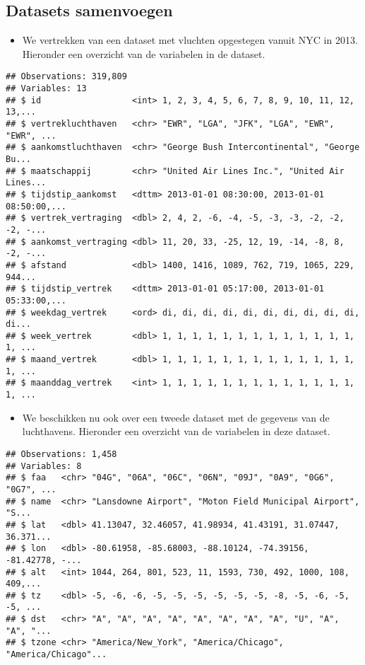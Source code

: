 \documentclass[]{memoir}
\providecommand{\tightlist}{%
  \setlength{\itemsep}{0pt}\setlength{\parskip}{0pt}}
\begin{document}
\subsection{Datasets samenvoegen}\label{datasets-samenvoegen}

\begin{itemize}
\tightlist
\item
  We vertrekken van een dataset met vluchten opgestegen vanuit NYC in
  2013. Hieronder een overzicht van de variabelen in de dataset.
\end{itemize}

\begin{verbatim}
## Observations: 319,809
## Variables: 13
## $ id                  <int> 1, 2, 3, 4, 5, 6, 7, 8, 9, 10, 11, 12, 13,...
## $ vertrekluchthaven   <chr> "EWR", "LGA", "JFK", "LGA", "EWR", "EWR", ...
## $ aankomstluchthaven  <chr> "George Bush Intercontinental", "George Bu...
## $ maatschappij        <chr> "United Air Lines Inc.", "United Air Lines...
## $ tijdstip_aankomst   <dttm> 2013-01-01 08:30:00, 2013-01-01 08:50:00,...
## $ vertrek_vertraging  <dbl> 2, 4, 2, -6, -4, -5, -3, -3, -2, -2, -2, -...
## $ aankomst_vertraging <dbl> 11, 20, 33, -25, 12, 19, -14, -8, 8, -2, -...
## $ afstand             <dbl> 1400, 1416, 1089, 762, 719, 1065, 229, 944...
## $ tijdstip_vertrek    <dttm> 2013-01-01 05:17:00, 2013-01-01 05:33:00,...
## $ weekdag_vertrek     <ord> di, di, di, di, di, di, di, di, di, di, di...
## $ week_vertrek        <dbl> 1, 1, 1, 1, 1, 1, 1, 1, 1, 1, 1, 1, 1, 1, ...
## $ maand_vertrek       <dbl> 1, 1, 1, 1, 1, 1, 1, 1, 1, 1, 1, 1, 1, 1, ...
## $ maanddag_vertrek    <int> 1, 1, 1, 1, 1, 1, 1, 1, 1, 1, 1, 1, 1, 1, ...
\end{verbatim}

\begin{itemize}
\tightlist
\item
  We beschikken nu ook over een tweede dataset met de gegevens van de
  luchthavens. Hieronder een overzicht van de variabelen in deze
  dataset.
\end{itemize}

\begin{verbatim}
## Observations: 1,458
## Variables: 8
## $ faa   <chr> "04G", "06A", "06C", "06N", "09J", "0A9", "0G6", "0G7", ...
## $ name  <chr> "Lansdowne Airport", "Moton Field Municipal Airport", "S...
## $ lat   <dbl> 41.13047, 32.46057, 41.98934, 41.43191, 31.07447, 36.371...
## $ lon   <dbl> -80.61958, -85.68003, -88.10124, -74.39156, -81.42778, -...
## $ alt   <int> 1044, 264, 801, 523, 11, 1593, 730, 492, 1000, 108, 409,...
## $ tz    <dbl> -5, -6, -6, -5, -5, -5, -5, -5, -5, -8, -5, -6, -5, -5, ...
## $ dst   <chr> "A", "A", "A", "A", "A", "A", "A", "A", "U", "A", "A", "...
## $ tzone <chr> "America/New_York", "America/Chicago", "America/Chicago"...
\end{verbatim}
\end{document}
